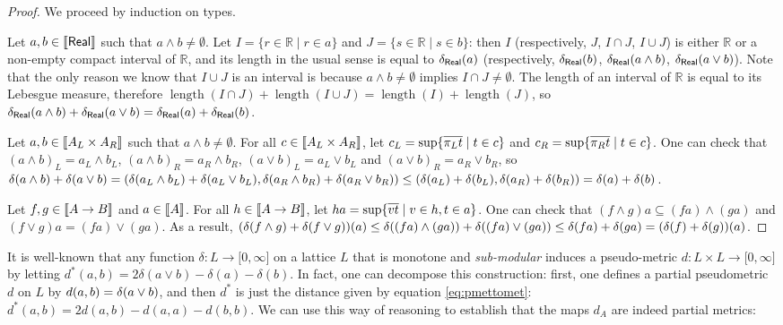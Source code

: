 \begin{proof}
We proceed by induction on types.

Let $a,b \in \llbracket \mathsf{Real} \rrbracket$ such that $a\wedge b \neq \emptyset$. Let $I = \{r \in \mathbb{R} \mid r \in a\}$ and $J = \{s \in \mathbb{R} \mid s \in b\}$: then $I$ (respectively, $J$, $I \cap J$, $I \cup J$) is either $\mathbb{R}$ or a non-empty compact interval of $\mathbb{R}$, and its length in the usual sense is equal to $\delta_\mathsf{Real}(a)$ (respectively, $\delta_\mathsf{Real}(b)$, $\delta_\mathsf{Real}(a \wedge b)$, $\delta_\mathsf{Real}(a \vee b)$). Note that the only reason we know that $I \cup J$ is an interval is because $a\wedge b \neq \emptyset$ implies $I \cap J \neq \emptyset$. The length of an interval of $\mathbb{R}$ is equal to its Lebesgue measure, therefore $\operatorname{length}(I \cap J) + \operatorname{length}(I \cup J) = \operatorname{length}(I) + \operatorname{length}(J)$, so $\delta_\mathsf{Real}(a \wedge b) + \delta_\mathsf{Real}(a \vee b) = \delta_\mathsf{Real}(a) + \delta_\mathsf{Real}(b)$.

Let $a,b \in \llbracket A_L \times A_R \rrbracket$ such that $a\wedge b \neq \emptyset$. For all $c \in \llbracket A_L \times A_R \rrbracket$, let $c_L = \sup\{\overline{\pi_L t} \mid t \in c\}$ and $c_R = \sup\{\overline{\pi_R t} \mid t \in c\}$.
One can check that $(a \wedge b)_L = a_L \wedge b_L$, $(a \wedge b)_R = a_R \wedge b_R$, $(a \vee b)_L = a_L \vee b_L$ and $(a \vee b)_R = a_R \vee b_R$, so $\delta(a \wedge b) + \delta(a \vee b) = (\delta(a_L \wedge b_L) + \delta(a_L \vee b_L),  \delta(a_R \wedge b_R) + \delta(a_R \vee b_R)) \leq (\delta(a_L) + \delta(b_L), \delta(a_R) + \delta(b_R)) = \delta(a) + \delta(b)$.

Let $f,g \in \llbracket A \to B \rrbracket$ and $a \in \llbracket A \rrbracket$. For all $h \in \llbracket A \to B \rrbracket$, let $ha = \sup\{\overline{vt} \mid v \in h, t \in a\}$. One can check that $(f \wedge g)a \subseteq (f a) \wedge (g a)$ and $(f \vee g)a = (f a) \vee (g a)$. As a result, $(\delta(f \wedge g)+ \delta(f \vee g))(a) \leq \delta((fa) \wedge (ga)) + \delta((fa) \vee (ga)) \leq \delta(fa) + \delta(ga) = (\delta(f)+\delta(g))(a)$.
\end{proof}

It is well-known  \cite{6845021} that any 
function $\delta: L\to \mathbb [0,\infty]$ on a lattice $L$ that is monotone and \emph{sub-modular} induces a pseudo-metric $d: L\times L \to \mathbb [0,\infty]$ by letting $d^*(a,b)=2\delta(a\vee b)-\delta(a)-\delta(b)$. In fact, one can decompose this construction: first, one defines a partial pseudometric $d$ on $L$ by $d(a,b) = \delta(a \vee b)$, and then $d^*$ is just the distance given by equation \eqref{eq:pmettomet}: $d^*(a,b) = 2d(a,b)-d(a,a)-d(b,b)$. We can use this way of reasoning to establish that the maps $d_{A}$ are indeed partial metrics:

